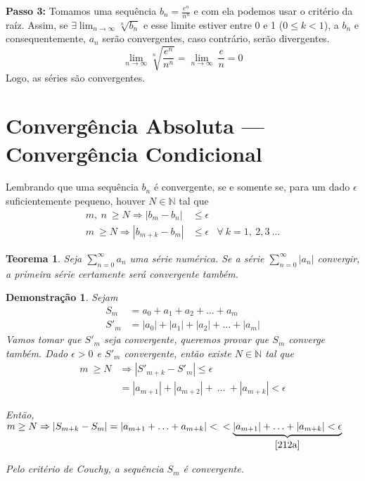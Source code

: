 \documentclass[12pt,openany, letterpaper]{book}
\newtheorem{theorem}{Teorema}[section]
\newtheorem{demonstration}{Demonstração}
\begin{document}
\textbf{Passo 3:} Tomamos uma sequência $b_n = \displaystyle{\frac{e^n}{n^n}}$ e com ela podemos usar o critério da raíz. Assim, se $\displaystyle{\exists \lim_{n \rightarrow \infty} \sqrt[n]{b_n}}$ e esse limite estiver entre 0 e 1 ($0 \leq k < 1$), a $b_n$ e consequentemente, $a_n$ serão convergentes, caso contrário, serão divergentes. $$\lim_{n \rightarrow \infty} \sqrt[n]{\frac{e^n}{n^n}} = \lim_{n \rightarrow \infty} \ \frac{e}{n} = 0$$ Logo, as séries são convergentes. \\
\vspace{7mm}

\section{Convergência Absoluta --- Convergência Condicional}

\hspace{5mm} Lembrando que uma sequência $b_n$ é convergente, se e somente se, para um dado $\epsilon$ suficientemente pequeno, houver $N \in \mathds{N}$ tal que \begin{align*}
m,\ n \ \geq N \Rightarrow |b_m - b_n| &\leq \epsilon \\
m \ \geq N \Rightarrow |b_{m+k} - b_m| &\leq \epsilon & \forall \ k = 1,\ 2, 3 \ \hdots
\end{align*}

\begin{theorem}
Seja $\displaystyle{\sum_{n=0}^{\infty} a_n}$ uma série numérica. Se a série $\displaystyle{\sum_{n=0}^{\infty} |a_n|}$ convergir, a primeira série certamente será convergente também.
\end{theorem}

\begin{demonstration}
Sejam \begin{align*}
S_m &= a_0 + a_1 + a_2 + \hdots + a_m \\
S'_m &= |a_0| + |a_1| + |a_2| + \hdots + |a_m|
\end{align*}
Vamos tomar que $S'_m$ seja convergente, queremos provar que $S_m$ converge também.
Dado $\epsilon > 0$ e $S'_m$ convergente, então existe $N \in \mathds{N}$ tal que \begin{align}
m \ \geq N &\Rightarrow |S'_{m+k} - S'_m| \leq \epsilon \\
&= |a_{m+1}| + |a_{m+2}| + \ \hdots \ + |a_{m+k}| < \epsilon \label{212a}
\end{align}

Então, $m \geq N \Rightarrow |S_{m+k} - S_m| = |a_{m+1} +\hdots + a_{m+k}| < \\ < \underbrace{|a_{m+1}| + \hdots + |a_{m+k}| < \epsilon}_{\ref{212a}}$

Pelo critério de Couchy, a sequência $S_m$ é convergente.
\end{demonstration}
\end{document}
